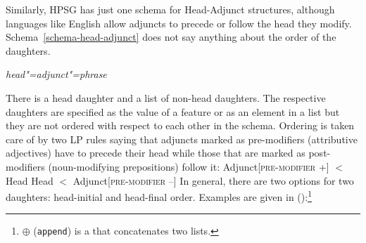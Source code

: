 \documentclass[output=paper]{langsci/langscibook}
\begin{document}
Similarly, HPSG has just one schema for Head-Adjunct structures, although languages like
English allow adjuncts to precede or follow the head they modify. Schema~\ref{schema-head-adjunct} does not say anything
about the order of the daughters.
\begin{schema}
\label{schema-head-adjunct}
\textit{head"=adjunct"=phrase} \impl\\
\end{schema}
There is a head daughter and a list of non-head daughters. The respective daughters are specified as
the value of a feature or as an element in a list but they are not ordered with respect to each
other in the schema. Ordering is taken care of by two LP rules saying that adjuncts marked
as pre-modifiers (\eg attributive adjectives) have to precede their head while those that are marked
as post-modifiers (noun-modifying prepositions) follow it:
\eal
\ex Adjunct[\textsc{pre-modifier} +] $<$ Head
\ex Head $<$ Adjunct[\textsc{pre-modifier} --]
\zl
In general, there are two options for two daughters: head-initial and head-final order. Examples are
given in ():\footnote{%
$\oplus$\is{$\oplus$} (\texttt{append}) is a  that concatenates two lists. 
}
\eal
\ex {}
\end{document}
